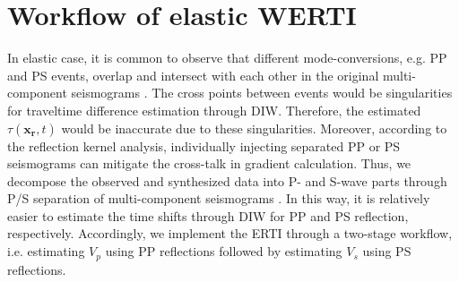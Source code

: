 \section{Workflow of elastic WERTI}
In elastic case, it is common to observe that different mode-conversions, e.g. PP
and PS events, overlap and intersect with each other in the original multi-component
seismograms . The cross points between events
would be singularities for traveltime difference estimation through DIW.
Therefore, the estimated $\tau(\mathbf{x_r},t)$ would be inaccurate due
to these singularities.
Moreover, according to the reflection kernel analysis, individually injecting separated
PP or PS seismograms
can mitigate the cross-talk in gradient calculation. 
Thus, we decompose the observed and synthesized data into P- and S-wave
parts through P/S separation of multi-component seismograms \cite[]{Li2016a}.
In this way, 
it is relatively easier to estimate the time shifts through DIW for PP and PS reflection,
respectively.
Accordingly, we implement the ERTI through a two-stage
workflow, i.e. estimating $V_p$ using PP reflections followed by estimating $V_s$ 
using PS reflections.

